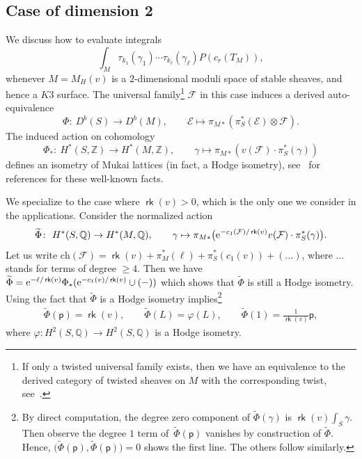 \documentclass[pdftex]{sigma}
\numberwithin{equation}{section}
\newcommand{\BQ}{{\mathbb{Q}}}
\newcommand{\BZ}{{\mathbb{Z}}}
\newcommand{\CE}{{\mathcal E}}
\newcommand{\CF}{{\mathcal F}}
\newcommand{\pt}{{\mathsf{p}}}
\newcommand{\ch}{{\mathrm{ch}}}
\newcommand{\1}{\mathsf{1}}
\newcommand\rk{\operatorname{\mathsf{rk}}}
\begin{document}
\subsection{Case of dimension 2} \label{subsec:Case dim 2}
We discuss how to evaluate integrals
\begin{equation} \label{descendent integral repeated}
\int_{M} \tau_{k_1}(\gamma_1) \cdots \tau_{k_{\ell}}(\gamma_{\ell}) P(c_r(T_{M})),
\end{equation}
whenever $M = M_H(v)$ is a $2$-dimensional moduli space of stable sheaves, and hence a $K3$ surface.
The universal family\footnote{If only a twisted universal family exists, then
we have an equivalence to the derived category of twisted sheaves on $M$ with the corresponding twist, see~\cite{HuybrechtsK3}.} $\CF$ in this case induces a derived auto-equivalence
\[
\Phi\colon \  D^b(S) \to D^b(M), \qquad
\CE \mapsto \pi_{M \ast}( \pi_S^{\ast}(\CE) \otimes \CF ).
\]
The induced action on cohomology
\[
\Phi_{\ast}\colon\  H^{\ast}(S,\BZ) \to H^{\ast}(M, \BZ),
\qquad \gamma \mapsto \pi_{M \ast}( v(\CF) \cdot \pi_S^{\ast}(\gamma))
\]
defines an isometry of Mukai lattices (in fact, a Hodge isometry), see~\cite[Chapter 16]{HuybrechtsK3} for references for these well-known facts.

We specialize to the case where $\rk(v) > 0$,
which is the only one we consider in the applications.
Consider the normalized action
\[
\widetilde{\Phi}\colon\  H^{\ast}(S,\BQ) \to H^{\ast}(M, \BQ), \qquad
\gamma \mapsto \pi_{M \ast}\big( {\rm e}^{-c_1(\CF)/\rk(v)} v(\CF) \cdot \pi_S^{\ast}(\gamma)\big).
\]
Let us write $\ch(\CF) = \rk(v) + \pi_M^{\ast}(\ell) + \pi_S^{\ast}(c_1(v)) + (\ldots)$, where $\ldots$ stands for terms of degree $\geq 4$.
Then we have $\widetilde{\Phi} = {\rm e}^{-\ell/\rk(v)} \Phi_{\ast}({\rm e}^{-c_1(v)/\rk(v)} \cup ( - ) )$
which shows that $\widetilde{\Phi}$ is still a Hodge isometry.
Using the fact that $\widetilde{\Phi}$ is a Hodge isometry implies\footnote{By direct computation, the degree
zero component of $\widetilde{\Phi}(\gamma)$ is $\rk(v) \int_S \gamma$.
Then observe the degree $1$ term of~$\widetilde{\Phi}(\pt)$ vanishes by construction of $\widetilde{\Phi}$. Hence, $\big(\widetilde{\Phi}(\pt), \widetilde{\Phi}(\pt)\big)=0$
shows the first line. The others follow similarly.}
\begin{gather}
\widetilde{\Phi}(\pt)  = \rk(v),\qquad
\widetilde{\Phi}(L)  = \varphi(L),\qquad
\widetilde{\Phi}(1) = \frac{1}{\rk(v)} \pt, \label{phi tilde}
\end{gather}
where $\varphi\colon H^2(S,\BQ) \to H^2(S,\BQ)$ is a Hodge isometry.
\end{document}
